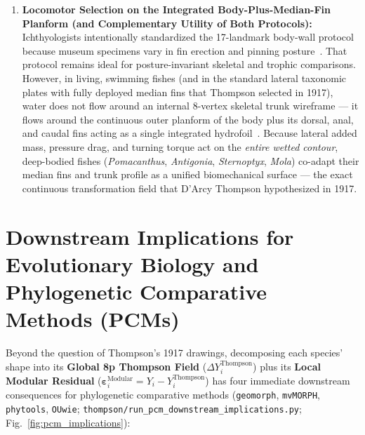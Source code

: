 \documentclass[11pt,a4paper]{article}
\theoremstyle{definition}
\theoremstyle{remark}
\begin{document}
\begin{enumerate}
  \item \textbf{Locomotor Selection on the Integrated Body-Plus-Median-Fin Planform (and Complementary Utility of Both Protocols):} Ichthyologists intentionally standardized the 17-landmark body-wall protocol because museum specimens vary in fin erection and pinning posture~\cite{ClaverieWainwright2014,Friedman2019}. That protocol remains ideal for posture-invariant skeletal and trophic comparisons. However, in living, swimming fishes (and in the standard lateral taxonomic plates with fully deployed median fins that Thompson selected in 1917), water does not flow around an internal 8-vertex skeletal trunk wireframe --- it flows around the continuous outer planform of the body plus its dorsal, anal, and caudal fins acting as a single integrated hydrofoil~\cite{Webb1984,Wainwright2002}. Because lateral added mass, pressure drag, and turning torque act on the \emph{entire wetted contour}, deep-bodied fishes (\emph{Pomacanthus}, \emph{Antigonia}, \emph{Sternoptyx}, \emph{Mola}) co-adapt their median fins and trunk profile as a unified biomechanical surface --- the exact continuous transformation field that D'Arcy Thompson hypothesized in 1917.
\end{enumerate}

\section{Downstream Implications for Evolutionary Biology and Phylogenetic Comparative Methods (PCMs)}
\label{sec:pcm_implications}

Beyond the question of Thompson's 1917 drawings, decomposing each species' shape into its \textbf{Global 8p Thompson Field} ($\Delta Y_i^{\mathrm{Thompson}}$) plus its \textbf{Local Modular Residual} ($\boldsymbol{\varepsilon}_i^{\mathrm{Modular}} = Y_i - Y_i^{\mathrm{Thompson}}$) has four immediate downstream consequences for phylogenetic comparative methods (\texttt{geomorph}, \texttt{mvMORPH}, \texttt{phytools}, \texttt{OUwie}; \texttt{thompson/run\_pcm\_downstream\_implications.py}; Fig.~\ref{fig:pcm_implications}):
\end{document}
